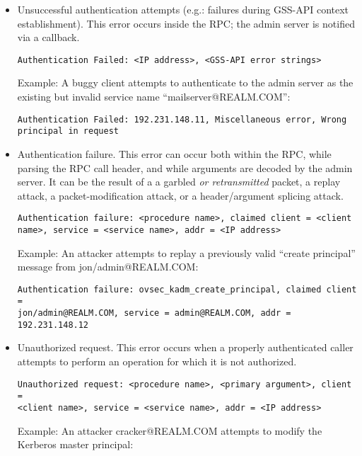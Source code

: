 \begin{itemize}
\item Unsuccessful authentication attempts (e.g.: failures during
GSS-API context establishment).  This error occurs inside the RPC; the
admin server is notified via a callback.

\begin{verbatim}
Authentication Failed: <IP address>, <GSS-API error strings>
\end{verbatim}

Example:  A buggy client attempts to authenticate to the admin server
as the existing but invalid service name ``mailserver@REALM.COM'':

\begin{verbatim}
Authentication Failed: 192.231.148.11, Miscellaneous error, Wrong
principal in request
\end{verbatim}

\item Authentication failure.  This error can occur both within the
RPC, while parsing the RPC call header, and while arguments are
decoded by the admin server.  It can be the result of a a garbled
{\it or retransmitted} packet, a replay attack, a packet-modification
attack, or a header/argument splicing attack.

\begin{verbatim}
Authentication failure: <procedure name>, claimed client = <client
name>, service = <service name>, addr = <IP address>
\end{verbatim}

Example: An attacker attempts to replay a previously valid ``create
principal'' message from jon/admin@REALM.COM:

\begin{verbatim}
Authentication failure: ovsec_kadm_create_principal, claimed client =
jon/admin@REALM.COM, service = admin@REALM.COM, addr = 192.231.148.12
\end{verbatim}

\item Unauthorized request.  This error occurs when a properly
authenticated caller attempts to perform an operation for which it is
not authorized.

\begin{verbatim}
Unauthorized request: <procedure name>, <primary argument>, client =
<client name>, service = <service name>, addr = <IP address>
\end{verbatim}

Example: An attacker cracker@REALM.COM attempts to modify the Kerberos
master principal:


\end{itemize}
